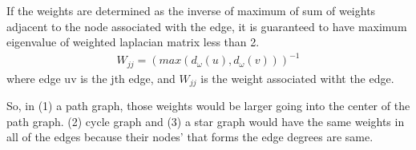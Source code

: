 \documentclass{article}
\begin{document}
\begin{problem}
        If the weights are determined as the inverse of maximum of sum of weights adjacent to the node associated with the edge, it is guaranteed to have maximum eigenvalue of weighted laplacian matrix less than 2. 
        \begin{align*}
            W_{jj} = (max{(d_{\omega}(u), d_{\omega}(v))})^{-1}
        \end{align*}
        where edge uv is the jth edge, and $W_{jj}$ is the weight associated witht the edge. 

    So, in (1) a path graph, those weights would be larger going into the center of the path graph. (2) cycle graph and (3) a star graph would have the same weights in all of the edges because their nodes' that forms the edge degrees are same. 
\end{problem}
\end{document}
